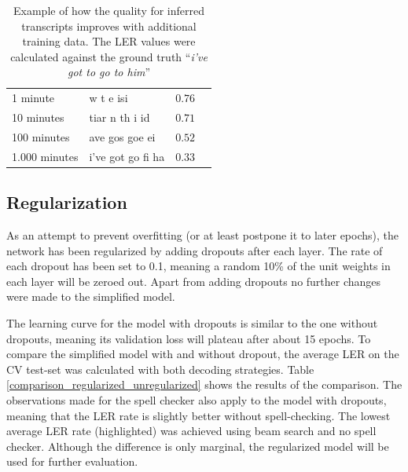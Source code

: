 \begin{table}[!htbp]
	\centering
	\begin{tabular}{llll}
		\toprule
		\thead{training data} & \thead{inferred transcript} & \thead{\ac{LER}} \\
		\midrule
		1 minute & w t e isi & $0.76$  \\ 	
		10 minutes & tiar n th i id & $0.71$  \\ 		
		100 minutes & ave gos goe ei & $0.52$  \\ 		
		1.000 minutes & i've got go fi ha & $0.33$  \\ 		
		\bottomrule
	\end{tabular}
	\caption{Example of how the quality for inferred transcripts improves with additional training data. The \ac{LER} values were calculated against the ground truth \foreignquote{french}{\textit{i've got to go to him}}}
	\label{training_progress}
\end{table}

\subsection{Regularization}
As an attempt to prevent overfitting (or at least postpone it to later epochs), the network has been regularized by adding dropouts after each layer. The rate of each dropout has been set to 0.1, meaning a random 10\% of the unit weights in each layer will be zeroed out. Apart from adding dropouts no further changes were made to the simplified model.

The learning curve for the model with dropouts is similar to the one without dropouts, meaning its validation loss will plateau after about 15 epochs. To compare the simplified model with and without dropout, the average \ac{LER} on the \ac{CV} test-set was calculated with both decoding strategies. Table \ref{comparison_regularized_unregularized} shows the results of the comparison. The observations made for the spell checker also apply to the model with dropouts, meaning that the \ac{LER} rate is slightly better without spell-checking. The lowest average \ac{LER} rate (highlighted) was achieved using beam search and no spell checker. Although the difference is only marginal, the regularized model will be used for further evaluation.

